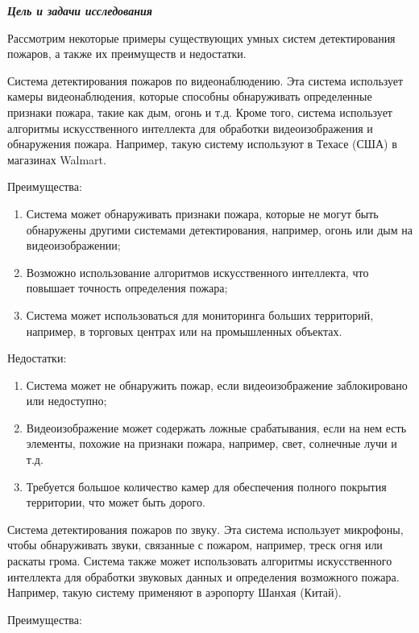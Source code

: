 \begin{multicols}{2}
{\bfseries \emph{Цель и задачи исследования}}

Рассмотрим некоторые примеры существующих умных систем детектирования
пожаров, а также их преимуществ и недостатки.

Система детектирования пожаров по видеонаблюдению. Эта система
использует камеры видеонаблюдения, которые способны обнаруживать
определенные признаки пожара, такие как дым, огонь и т.д. Кроме того,
система использует алгоритмы искусственного интеллекта для обработки
видеоизображения и обнаружения пожара. Например, такую систему
используют в Техасе (США) в магазинах Walmart.

Преимущества:

\begin{enumerate}
\def\labelenumi{\arabic{enumi}.}
\item
  Система может обнаруживать признаки пожара, которые не могут быть
  обнаружены другими системами детектирования, например, огонь или дым
  на видеоизображении;
\item
  Возможно использование алгоритмов искусственного интеллекта, что
  повышает точность определения пожара;
\item
  Система может использоваться для мониторинга больших территорий,
  например, в торговых центрах или на промышленных объектах.
\end{enumerate}

Недостатки:

\begin{enumerate}
\def\labelenumi{\arabic{enumi}.}
\item
  Система может не обнаружить пожар, если видеоизображение заблокировано
  или недоступно;
\item
  Видеоизображение может содержать ложные срабатывания, если на нем есть
  элементы, похожие на признаки пожара, например, свет, солнечные лучи и
  т.д.
\item
  Требуется большое количество камер для обеспечения полного покрытия
  территории, что может быть дорого.
\end{enumerate}

Система детектирования пожаров по звуку. Эта система использует
микрофоны, чтобы обнаруживать звуки, связанные с пожаром, например,
треск огня или раскаты грома. Система также может использовать алгоритмы
искусственного интеллекта для обработки звуковых данных и определения
возможного пожара. Например, такую систему применяют в аэропорту Шанхая
(Китай).

Преимущества:


\end{multicols}
